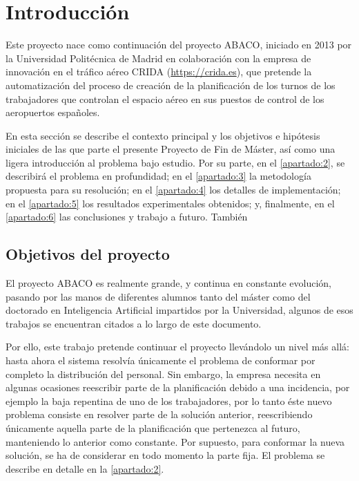 \graphicspath{{capitulos/Capitulo1-Introduccion/recursos/}}


\section{Introducción}

Este proyecto nace como continuación del proyecto ABACO, iniciado en 2013 por la Universidad Politécnica de Madrid en
colaboración con la empresa de innovación en el tráfico aéreo CRIDA (\url{https://crida.es}), que pretende la
automatización del proceso de creación de la planificación de los turnos de los trabajadores que controlan el espacio 
aéreo en sus puestos de control de los aeropuertos españoles.

En esta sección se describe el contexto principal y los objetivos e hipótesis iniciales de las que parte el presente Proyecto de Fin de Máster, así como una ligera introducción al problema bajo estudio. Por su parte, en el 
\autoref{apartado:2}, se describirá el problema en profundidad; en el \autoref{apartado:3}
la metodología propuesta para su resolución; en el \autoref{apartado:4} los detalles de implementación;
en el \autoref{apartado:5} los resultados experimentales obtenidos; y, finalmente, en el \autoref{apartado:6} las 
conclusiones y trabajo a futuro. También  %

\subsection{Objetivos del proyecto}
\label{sec:Objectivos}
El proyecto \gls{ABACO} es realmente grande, y continua en constante evolución, pasando por las manos de 
diferentes alumnos tanto del máster como del doctorado en Inteligencia Artificial impartidos por la Universidad, algunos de esos trabajos se encuentran citados a lo largo de este documento. 

Por ello, este trabajo pretende continuar el proyecto llevándolo un nivel más allá: hasta ahora el sistema resolvía únicamente el problema de conformar por completo la distribución del personal. 
Sin embargo, la empresa necesita en algunas ocasiones reescribir parte de la planificación debido a una incidencia, por ejemplo la baja repentina de uno de los trabajadores, por lo tanto éste nuevo problema consiste en resolver parte de la solución anterior, reescribiendo únicamente aquella parte de la planificación que pertenezca al futuro, manteniendo lo anterior como constante. 
Por supuesto, para conformar la nueva solución, se ha de considerar en todo momento la parte fija. El problema se describe en detalle en la \autoref{apartado:2}.

